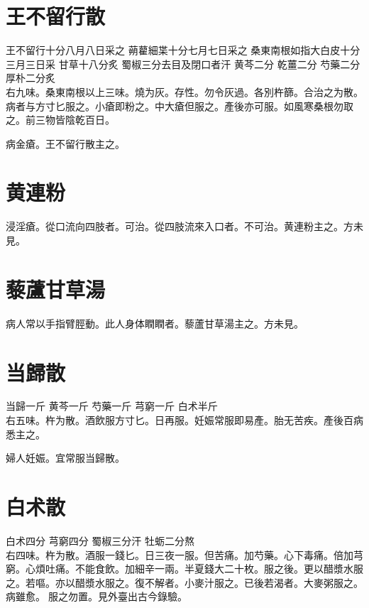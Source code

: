 \section{王不留行散}

王不留行{\scriptsize 十分八月八日采之} 蒴藋細枼{\scriptsize 十分七月七日采之} 桑東南根{\scriptsize 如指大白皮十分三月三日采} 甘草{\scriptsize 十八分炙} 蜀椒{\scriptsize 三分去目及閉口者汗} 黄芩{\scriptsize 二分} 乾薑{\scriptsize 二分} 芍藥{\scriptsize 二分} 厚朴{\scriptsize 二分炙}\\
右九味。桑東南根以上三味。燒为灰。存性。勿令灰過。各別杵篩。合治之为散。病者与方寸匕服之。小瘡即粉之。中大瘡但服之。產後亦可服。如風寒桑根勿取之。前三物皆陰乾百日。

病金瘡。王不留行散主之。

\section{黄連粉}

浸淫瘡。從口流向四肢者。可治。從四肢流來入口者。不可治。黄連粉主之。{\scriptsize 方未見。}

\section{藜蘆甘草湯}

病人常以手指臂脛動。此人身体瞤瞤者。藜蘆甘草湯主之。{\scriptsize 方未見。}

\section{当歸散}

当歸{\scriptsize 一斤} 黄芩{\scriptsize 一斤} 芍藥{\scriptsize 一斤} 芎窮{\scriptsize 一斤} 白术{\scriptsize 半斤}\\
右五味。杵为散。酒飲服方寸匕。日再服。妊娠常服即易產。胎无苦疾。產後百病悉主之。

婦人妊娠。宜常服当歸散。

\section{白术散}

白术{\scriptsize 四分} 芎窮{\scriptsize 四分} 蜀椒{\scriptsize 三分汗} 牡蛎{\scriptsize 二分熬} \\
右四味。杵为散。酒服一錢匕。日三夜一服。但苦痛。加芍藥。心下毒痛。倍加芎窮。心煩吐痛。不能食飲。加細辛一兩。半夏錢大二十枚。服之後。更以醋漿水服之。若嘔。亦以醋漿水服之。復不解者。小麥汁服之。已後若渴者。大麥粥服之。病雖愈。{\sungtpii 𥁞}服之勿置。{\scriptsize 見外臺出古今錄驗。}

